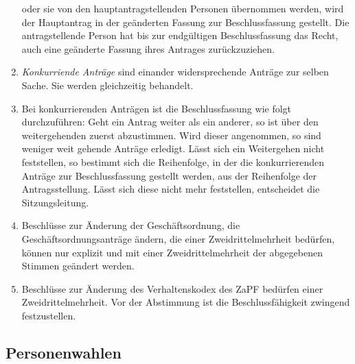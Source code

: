 \documentclass[
  a4paper,
  oneside]{scrartcl}
\begin{document}
\begin{enumerate}
  oder sie von den hauptantragstellenden Personen übernommen werden,
  wird der Hauptantrag in der geänderten Fassung zur Beschlussfassung
  gestellt. Die antragstellende Person hat bis zur endgültigen
  Beschlussfassung das Recht, auch eine geänderte Fassung ihres Antrages
  zurückzuziehen.
\item
  \emph{Konkurriende Anträge} sind einander widersprechende Anträge zur
  selben Sache. Sie werden gleichzeitig behandelt.
\item
  Bei konkurrierenden Anträgen ist die Beschlussfassung wie folgt
  durchzuführen: Geht ein Antrag weiter als ein anderer, so ist über den
  weitergehenden zuerst abzustimmen. Wird dieser angenommen, so sind
  weniger weit gehende Anträge erledigt. Lässt sich ein Weitergehen
  nicht feststellen, so bestimmt sich die Reihenfolge, in der die
  konkurrierenden Anträge zur Beschlussfassung gestellt werden, aus der
  Reihenfolge der Antragsstellung. Lässt sich diese nicht mehr
  feststellen, entscheidet die Sitzungsleitung.
\item
  Beschlüsse zur Änderung der Geschäftsordnung, die
  Geschäftsordnungsanträge ändern, die einer Zweidrittelmehrheit
  bedürfen, können nur explizit und mit einer Zweidrittelmehrheit der
  abgegebenen Stimmen geändert werden.
\item
  Beschlüsse zur Änderung des Verhaltenskodex des ZaPF bedürfen einer
  Zweidrittelmehrheit. Vor der Abstimmung ist die Beschlussfähigkeit
  zwingend festzustellen.
\end{enumerate}

\subsection{Personenwahlen}\label{personenwahlen}
\end{document}
